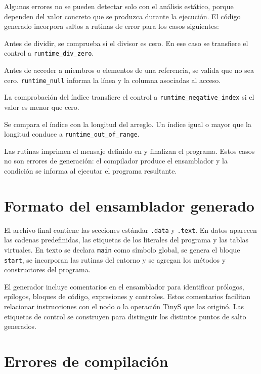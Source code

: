 Algunos errores no se pueden detectar solo con el análisis estático,
porque dependen del valor concreto que se produzca durante la
ejecución. El código generado incorpora saltos a rutinas de error para
los casos siguientes:

\begin{description}[style=nextline]
  \item[División por cero]
  Antes de dividir, se comprueba si el divisor es cero. En ese caso se
  transfiere el control a \texttt{runtime\_div\_zero}.
  \item[Referencia nula]
  Antes de acceder a miembros o elementos de una referencia, se valida
  que no sea cero. \texttt{runtime\_null} informa la línea y la columna
  asociadas al acceso.
  \item[Índice negativo]
  La comprobación del índice transfiere el control a
  \texttt{runtime\_negative\_index} si el valor es menor que cero.
  \item[Índice fuera de rango]
  Se compara el índice con la longitud del arreglo. Un índice igual o
  mayor que la longitud conduce a \texttt{runtime\_out\_of\_range}.
\end{description}

Las rutinas imprimen el mensaje definido en  y
finalizan el programa. Estos casos no son errores de generación: el
compilador produce el ensamblador y la condición se informa al ejecutar
el programa resultante.

\section{Formato del ensamblador generado}
\label{sec:formato-asm}

El archivo final contiene las secciones estándar \texttt{.data} y
\texttt{.text}. En datos aparecen las cadenas predefinidas, las
etiquetas de los literales del programa y las tablas virtuales. En texto
se declara \texttt{main} como símbolo global, se genera el bloque
\texttt{start}, se incorporan las rutinas del entorno y se agregan los
métodos y constructores del programa.

El generador incluye comentarios en el ensamblador para identificar
prólogos, epílogos, bloques de código, expresiones y controles. Estos
comentarios facilitan relacionar instrucciones con el nodo o la
operación TinyS que las originó. Las etiquetas de control se construyen
para distinguir los distintos puntos de salto generados.


\section{Errores de compilación}
\label{sec:errores-generacion}

